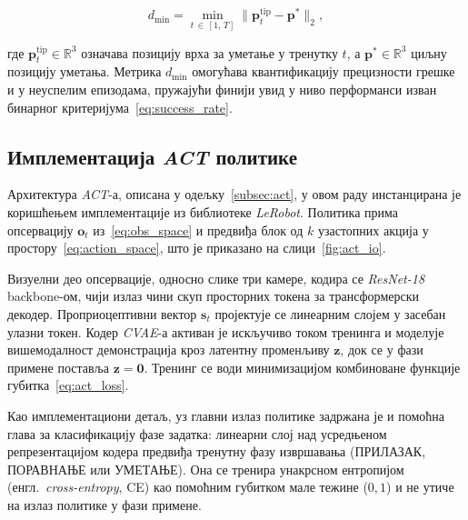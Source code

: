 \documentclass[12pt, a4paper]{article}
\begin{document}
\begin{equation}
    d_{\min} = \min_{t \,\in\, [1,\,T]} \bigl\|\mathbf{p}_t^{\mathrm{tip}} - \mathbf{p}^*\bigr\|_2,
    \label{eq:d_min}
\end{equation}

\noindent где $\mathbf{p}_t^{\mathrm{tip}} \in \mathbb{R}^3$ означава позицију врха за уметање у тренутку $t$, а $\mathbf{p}^* \in \mathbb{R}^3$ циљну позицију уметања.
Метрика $d_{\min}$ омогућава квантификацију прецизности грешке и у неуспелим епизодама, пружајући финији увид у ниво перформанси изван бинарног критеријума~\eqref{eq:success_rate}.

\subsection{Имплементација \textit{ACT} политике}
\label{subsec:act_impl}

Архитектура \textit{ACT}-а, описана у одељку~\ref{subsec:act}, у овом раду инстанцирана је коришћењем имплементације из библиотеке \textit{LeRobot}.
Политика прима опсервацију $\mathbf{o}_t$ из~\eqref{eq:obs_space} и предвиђа блок од $k$ узастопних акција у простору~\eqref{eq:action_space}, што је приказано на слици~\ref{fig:act_io}.

Визуелни део опсервације, односно слике три камере, кодира се \textit{ResNet-18} backbone-ом, чији излаз чини скуп просторних токена за трансформерски декодер.
Проприоцептивни вектор $\mathbf{s}_t$ пројектује се линеарним слојем у засебан улазни токен.
Кодер \textit{CVAE}-а активан је искључиво током тренинга и моделује вишемодалност демонстрација кроз латентну променљиву $\mathbf{z}$, док се у фази примене поставља $\mathbf{z} = \mathbf{0}$.
Тренинг се води минимизацијом комбиноване функције губитка~\eqref{eq:act_loss}.

Као имплементациони детаљ, уз главни излаз политике задржана је и помоћна глава за класификацију фазе задатка: линеарни слој над усредњеном репрезентацијом кодера предвиђа тренутну фазу извршавања (ПРИЛАЗАК, ПОРАВНАЊЕ или УМЕТАЊЕ).
Она се тренира унакрсном ентропијом (енгл.\ \textit{cross-entropy}, CE) као помоћним губитком мале тежине ($0{,}1$) и не утиче на излаз политике у фази примене.
\end{document}
